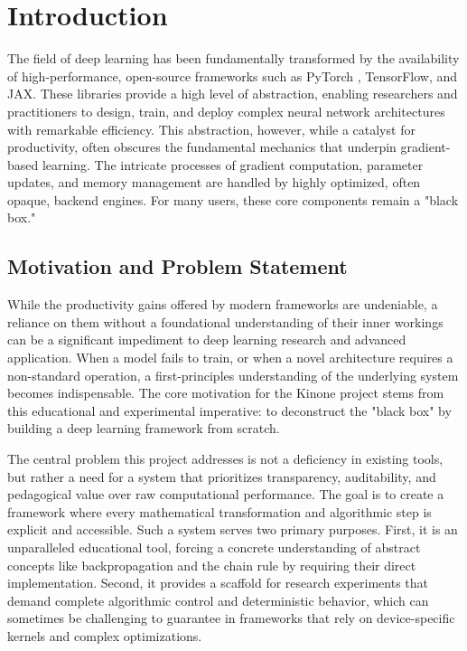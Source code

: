 \documentclass[a4paper]{article}
\begin{document}
\section{Introduction}

The field of deep learning has been fundamentally transformed by the availability of high-performance, open-source frameworks such as PyTorch \cite{paszke2019pytorch}, TensorFlow, and JAX. These libraries provide a high level of abstraction, enabling researchers and practitioners to design, train, and deploy complex neural network architectures with remarkable efficiency. This abstraction, however, while a catalyst for productivity, often obscures the fundamental mechanics that underpin gradient-based learning. The intricate processes of gradient computation, parameter updates, and memory management are handled by highly optimized, often opaque, backend engines. For many users, these core components remain a "black box."

\subsection{Motivation and Problem Statement}

While the productivity gains offered by modern frameworks are undeniable, a reliance on them without a foundational understanding of their inner workings can be a significant impediment to deep learning research and advanced application. When a model fails to train, or when a novel architecture requires a non-standard operation, a first-principles understanding of the underlying system becomes indispensable. The core motivation for the Kinone project stems from this educational and experimental imperative: to deconstruct the "black box" by building a deep learning framework from scratch.

The central problem this project addresses is not a deficiency in existing tools, but rather a need for a system that prioritizes transparency, auditability, and pedagogical value over raw computational performance. The goal is to create a framework where every mathematical transformation and algorithmic step is explicit and accessible. Such a system serves two primary purposes. First, it is an unparalleled educational tool, forcing a concrete understanding of abstract concepts like backpropagation and the chain rule by requiring their direct implementation. Second, it provides a scaffold for research experiments that demand complete algorithmic control and deterministic behavior, which can sometimes be challenging to guarantee in frameworks that rely on device-specific kernels and complex optimizations.
\end{document}
